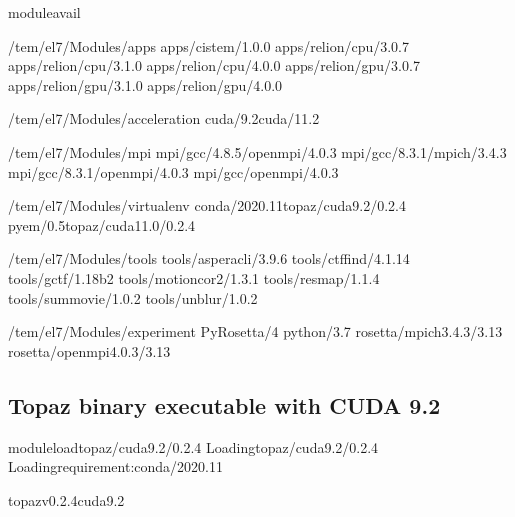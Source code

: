 \documentclass[a4paper,10pt,english]{sphinxmanual}
\begin{document}
\begin{sphinxVerbatim}[commandchars=\\\{\}]
\PYGZdl{}\PYGZgt{}moduleavail

\PYGZhy{}\PYGZhy{}\PYGZhy{}\PYGZhy{}\PYGZhy{}\PYGZhy{}\PYGZhy{}\PYGZhy{}/tem/el7/Modules/apps\PYGZhy{}\PYGZhy{}\PYGZhy{}\PYGZhy{}\PYGZhy{}\PYGZhy{}\PYGZhy{}\PYGZhy{}
apps/cistem/1.0.0
apps/relion/cpu/3.0.7
apps/relion/cpu/3.1.0
apps/relion/cpu/4.0.0
apps/relion/gpu/3.0.7
apps/relion/gpu/3.1.0
apps/relion/gpu/4.0.0

\PYGZhy{}\PYGZhy{}\PYGZhy{}\PYGZhy{}/tem/el7/Modules/acceleration\PYGZhy{}\PYGZhy{}\PYGZhy{}\PYGZhy{}
cuda/9.2cuda/11.2

\PYGZhy{}\PYGZhy{}\PYGZhy{}\PYGZhy{}\PYGZhy{}\PYGZhy{}\PYGZhy{}\PYGZhy{}/tem/el7/Modules/mpi\PYGZhy{}\PYGZhy{}\PYGZhy{}\PYGZhy{}\PYGZhy{}\PYGZhy{}\PYGZhy{}\PYGZhy{}\PYGZhy{}
mpi/gcc/4.8.5/openmpi/4.0.3
mpi/gcc/8.3.1/mpich/3.4.3
mpi/gcc/8.3.1/openmpi/4.0.3
mpi/gcc/openmpi/4.0.3

\PYGZhy{}\PYGZhy{}\PYGZhy{}\PYGZhy{}\PYGZhy{}/tem/el7/Modules/virtualenv\PYGZhy{}\PYGZhy{}\PYGZhy{}\PYGZhy{}\PYGZhy{}
conda/2020.11topaz/cuda\PYGZhy{}9.2/0.2.4
pyem/0.5topaz/cuda\PYGZhy{}11.0/0.2.4

\PYGZhy{}\PYGZhy{}\PYGZhy{}\PYGZhy{}\PYGZhy{}\PYGZhy{}\PYGZhy{}/tem/el7/Modules/tools\PYGZhy{}\PYGZhy{}\PYGZhy{}\PYGZhy{}\PYGZhy{}\PYGZhy{}\PYGZhy{}\PYGZhy{}
tools/aspera\PYGZhy{}cli/3.9.6
tools/ctffind/4.1.14
tools/gctf/1.18\PYGZus{}b2
tools/motioncor2/1.3.1
tools/resmap/1.1.4
tools/summovie/1.0.2
tools/unblur/1.0.2

\PYGZhy{}\PYGZhy{}\PYGZhy{}\PYGZhy{}\PYGZhy{}/tem/el7/Modules/experiment\PYGZhy{}\PYGZhy{}\PYGZhy{}\PYGZhy{}\PYGZhy{}
PyRosetta/4
python/3.7
rosetta/mpich\PYGZhy{}3.4.3/3.13
rosetta/openmpi\PYGZhy{}4.0.3/3.13
\end{sphinxVerbatim}


\subsection{Topaz binary executable with CUDA 9.2}
\label{\detokenize{topaz:topaz-binary-executable-with-cuda-9-2}}
\begin{sphinxVerbatim}[commandchars=\\\{\}]
\PYGZdl{}\PYGZgt{}moduleloadtopaz/cuda\PYGZhy{}9.2/0.2.4
Loadingtopaz/cuda\PYGZhy{}9.2/0.2.4
Loadingrequirement:conda/2020.11

topaz\PYGZhy{}v0.2.4\PYGZhy{}cuda9.2\PYGZdl{}\PYGZgt{}
\end{sphinxVerbatim}
\end{document}
